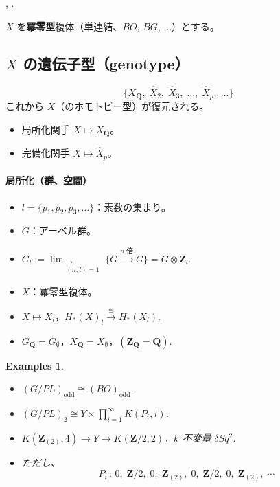 \documentclass[uplatex,dvipdfmx,a4paper,12pt]{jlreq}
\newtheorem{example}[theorem]{Examples}
\newcommand{\Z}{\mathbf{Z}}
\newcommand{\Q}{\mathbf{Q}}
\begin{document}
\cite{S70}, \cite{S74}.

$X$ を\textbf{冪零型}複体（単連結、$BO$, $BG$, $\ldots$）とする。

\subsection{$X$ の遺伝子型（genotype）}

\[
  \{X_\Q,\; \hat{X}_2,\; \hat{X}_3,\; \ldots,\; \hat{X}_p,\; \ldots\}
\]
これから $X$（のホモトピー型）が復元される。
\begin{itemize}
  \item 局所化関手 $X \mapsto X_\Q$。
  \item 完備化関手 $X \mapsto \hat{X}_p$。
\end{itemize}

\paragraph{局所化（群、空間）}
\begin{itemize}
  \item $l = \{p_1, p_2, p_3, \ldots\}$：素数の集まり。
  \item $G$：アーベル群。
  \item $G_l := \displaystyle\lim_{\substack{\longrightarrow \\ (n,l)=1}}
        \bigl\{ G \xrightarrow{n \text{ 倍}} G \bigr\} = G \otimes \Z_l$.
  \item $X$：冪零型複体。
  \item $X \mapsto X_l$，\quad $H_*(X)_l \stackrel{\cong}{\longrightarrow} H_*(X_l)$.
  \item $G_\Q = G_\emptyset$，\quad $X_\Q = X_\emptyset$，\quad $(\Z_\Q = \Q)$.
\end{itemize}

\begin{example}
  \begin{itemize}
    \item $(G/PL)_{\mathrm{odd}} \cong (BO)_{\mathrm{odd}}$.
    \item $(G/PL)_2 \cong Y \times \prod_{i=1}^\infty K(P_i, i)$.
    \item $K(\Z_{(2)}, 4) \to Y \to K(\Z/2, 2)$，\quad $k$ 不変量 $\delta Sq^2$.
    \item ただし、
          \[
            P_i\, :\, 0,\; \Z/2,\; 0,\; \Z_{(2)},\; 0,\; \Z/2,\;
            0,\; \Z_{(2)},\; \cdots
          \]
  \end{itemize}
\end{example}
\end{document}
